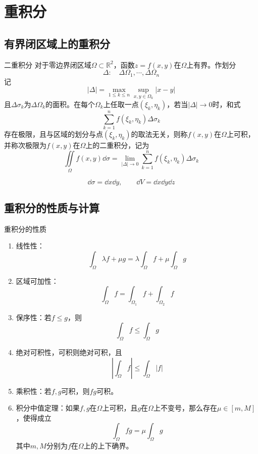 \documentclass[lang = cn, scheme = chinese, thmcnt = section]{elegantbook}
\newcommand{\R}{\mathbb{R}}            %
\newcommand{\sub}{\subset}             %
\begin{document}
\chapter{重积分}

\section{有界闭区域上的重积分}

\begin{definition}{二重积分}
	对于零边界闭区域$\Omega\sub\R^2$，函数$z=f(x,y)$在$\Omega$上有界。作划分
	$$
	\Delta:\quad \Delta\Omega_1,\cdots,\Delta \Omega_n
	$$
	记
	$$
	|\Delta|=\max_{1\le k \le n}\sup_{x,y\in\Omega_k}|x-y|
	$$
	且$\Delta \sigma_k$为$\Delta \Omega_k$的面积。在每个$\Omega_k$上任取一点$(\xi_k,\eta_k)$，若当$|\Delta|\to 0$时，和式
	$$
	\sum_{k=1}^{n}f(\xi_k,\eta_k)\Delta\sigma_k
	$$
	存在极限，且与区域的划分与点$(\xi_k,\eta_k)$的取法无关，则称$f(x,y)$在$\Omega$上可积，并称次极限为$f(x,y)$在$\Omega$上的二重积分，记为
	$$
	\iint\limits_{\Omega}f(x,y)\dd \sigma=\lim_{|\Delta|\to 0}\sum_{k=1}^{n}f(\xi_k,\eta_k)\Delta\sigma_k
	$$
\end{definition}

\begin{definition}
	$$
	\dd \sigma=\dd x\dd y,\qquad
	\dd V = \dd x\dd y \dd z
	$$
\end{definition}

\section{重积分的性质与计算}

\begin{proposition}{重积分的性质}
	\begin{enumerate}
		\item 线性性：
		$$
		\int_\Omega \lambda f+\mu g
		=\lambda\int_\Omega  f+\mu \int_\Omega  g
		$$
		\item 区域可加性：
		$$
		\int_\Omega f
		=\int_{\Omega_1} f+\int_{\Omega_2} f
		$$
		\item 保序性：若$f\le g$，则
		$$
		\int_\Omega f\le \int_\Omega g
		$$
		\item 绝对可积性，可积则绝对可积，且
		$$
		\left|\int_\Omega f\right|\le \int_\Omega |f|
		$$
		\item 乘积性：若$f,g$可积，则$fg$可积。
		\item 积分中值定理：如果$f,g$在$\Omega$上可积，且$g$在$\Omega$上不变号，那么存在$\mu\in [m,M]$，使得成立
		$$
		\int_\Omega fg=\mu\int_\Omega g
		$$
		其中$m,M$分别为$f$在$\Omega$上的上下确界。
	\end{enumerate}
\end{proposition}
\end{document}
